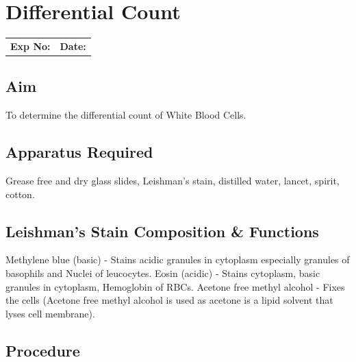 \documentclass[a4paper,12pt,openany,oneside]{book}
\begin{document}
					\chapter*{\centering Differential Count}
					\begin{tabular}{p{5in} p{1in}}
						\textbf{Exp No:}  & \textbf{Date:}\\
					\end{tabular}

					\section*{Aim}
					To determine the differential count of White Blood Cells.
					\section*{Apparatus Required}
					Grease free and dry glass slides, Leishman’s stain, distilled water, lancet, spirit, cotton.	
					\section*{Leishman's Stain Composition \& Functions}
					Methylene blue (basic) 	     -	Stains acidic granules in cytoplasm especially 						granules of basophils and Nuclei of leucocytes.\newline
					Eosin (acidic) 		     -	Stains cytoplasm, basic granules in 							cytoplasm, Hemoglobin of RBCs.\newline
					Acetone free methyl alcohol - 	Fixes the cells (Acetone free methyl alcohol 						is used as acetone is a lipid solvent that 		lyses cell membrane).

					\section*{Procedure}
\end{document}
